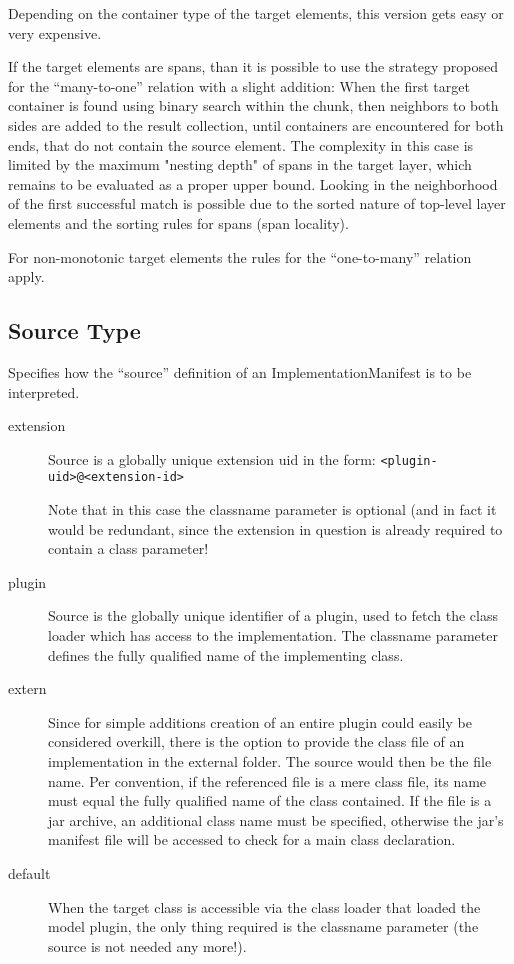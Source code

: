 \documentclass[11pt,a4paper]{report}
\begin{document}
\begin{description}
	Depending on the container type of the target elements, this version gets easy or very expensive.
	
	If the target elements are spans, than it is possible to use the strategy proposed for the ``many-to-one'' relation with a slight addition: When the first target container is found using binary search within the chunk, then neighbors to both sides are added to the result collection, until containers are encountered for both ends, that do not contain the source element. The complexity in this case is limited by the maximum "nesting depth" of spans in the target layer, which remains to be evaluated as a proper upper bound. Looking in the neighborhood of the first successful match is possible due to the sorted nature of top-level layer elements and the sorting rules for spans (span locality).
	
	For non-monotonic target elements the rules for the ``one-to-many'' relation apply.
\end{description}

\subsection{Source Type}
Specifies how the ``source'' definition of an ImplementationManifest is to be interpreted.
\label{sec:enum-source-type}
\begin{description}
	\item[extension] Source is a globally unique extension uid in the form: \texttt{<plugin-uid>@<extension-id>}
	
	Note that in this case the classname parameter is optional (and in fact it would be redundant, since the extension in question is already required to contain a class parameter!
	\item[plugin] Source is the globally unique identifier of a plugin, used to fetch the class loader which has access to the implementation. The classname parameter defines the fully qualified name of the implementing class.
	\item[extern] Since for simple additions creation of an entire plugin could easily be considered overkill, there is the option to provide the class file of an implementation in the external folder. The source would then be the file name. Per convention, if the referenced file is a mere class file, its name must equal the fully qualified name of the class contained. If the file is a jar archive, an additional class name must be specified, otherwise the jar's manifest file will be accessed to check for a main class declaration.
	\item[default] When the target class is accessible via the class loader that loaded the model plugin, the only thing required is the classname parameter (the source is not needed any more!).
\end{description}
	
\end{document}
